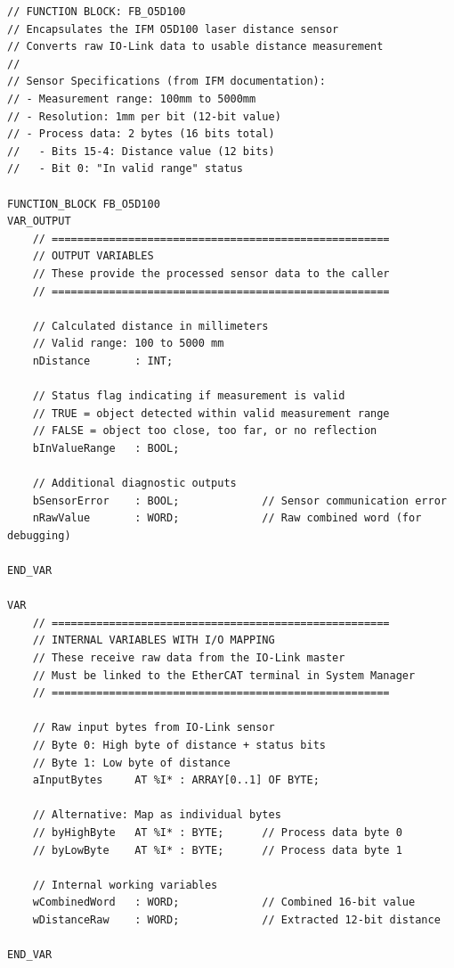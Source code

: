 \documentclass[11pt,a4paper]{article}
\begin{document}
\begin{lstlisting}
// FUNCTION BLOCK: FB_O5D100
// Encapsulates the IFM O5D100 laser distance sensor
// Converts raw IO-Link data to usable distance measurement
//
// Sensor Specifications (from IFM documentation):
// - Measurement range: 100mm to 5000mm
// - Resolution: 1mm per bit (12-bit value)
// - Process data: 2 bytes (16 bits total)
//   - Bits 15-4: Distance value (12 bits)
//   - Bit 0: "In valid range" status

FUNCTION_BLOCK FB_O5D100
VAR_OUTPUT
    // =====================================================
    // OUTPUT VARIABLES
    // These provide the processed sensor data to the caller
    // =====================================================
    
    // Calculated distance in millimeters
    // Valid range: 100 to 5000 mm
    nDistance       : INT;
    
    // Status flag indicating if measurement is valid
    // TRUE = object detected within valid measurement range
    // FALSE = object too close, too far, or no reflection
    bInValueRange   : BOOL;
    
    // Additional diagnostic outputs
    bSensorError    : BOOL;             // Sensor communication error
    nRawValue       : WORD;             // Raw combined word (for debugging)
    
END_VAR

VAR
    // =====================================================
    // INTERNAL VARIABLES WITH I/O MAPPING
    // These receive raw data from the IO-Link master
    // Must be linked to the EtherCAT terminal in System Manager
    // =====================================================
    
    // Raw input bytes from IO-Link sensor
    // Byte 0: High byte of distance + status bits
    // Byte 1: Low byte of distance
    aInputBytes     AT %I* : ARRAY[0..1] OF BYTE;
    
    // Alternative: Map as individual bytes
    // byHighByte   AT %I* : BYTE;      // Process data byte 0
    // byLowByte    AT %I* : BYTE;      // Process data byte 1
    
    // Internal working variables
    wCombinedWord   : WORD;             // Combined 16-bit value
    wDistanceRaw    : WORD;             // Extracted 12-bit distance
    
END_VAR
\end{lstlisting}
\end{document}
